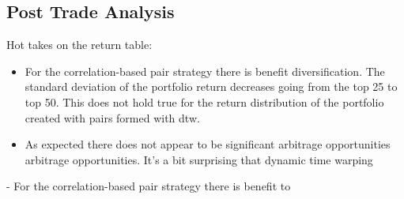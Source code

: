 \documentclass[12pt]{article}
\begin{document}
\subsection{Post Trade Analysis}


Hot takes on the return table:
\begin{itemize}
    \item For the correlation-based pair strategy there is benefit diversification. The standard deviation of the portfolio return decreases going from the top 25 to top 50. This does not hold true for the return distribution of the portfolio created with pairs formed with dtw.
    \item As expected there does not appear to be significant arbitrage opportunities arbitrage opportunities. It's a bit surprising that dynamic time warping 
\end{itemize}
- For the correlation-based pair strategy there is benefit to 
\end{document}
